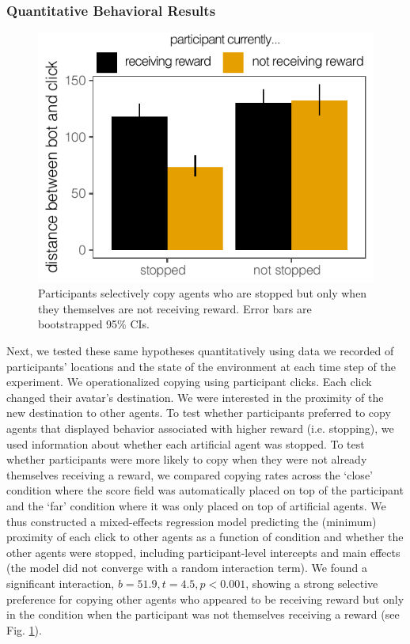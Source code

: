 \documentclass[12pt,letterpaper]{article}
\begin{document}
\subsubsection{Quantitative Behavioral Results}

\begin{figure}
    \centering
    \includegraphics[width=0.8 \linewidth]{figures/proximity.pdf}
    \vspace{-1em}
    \caption{Participants selectively copy agents who are stopped but only when they themselves are not receiving reward. Error bars are bootstrapped 95\% CIs.}
    \label{fig:proximity}
\end{figure}

Next, we tested these same hypotheses quantitatively using data we recorded of participants' locations and the state of the environment at each time step of the experiment.
We operationalized copying using participant clicks.
Each click changed their avatar's destination. 
We were interested in the proximity of the new destination to other agents.
To test whether participants preferred to copy agents that displayed behavior associated with higher reward (i.e. stopping), we used information about whether each artificial agent was stopped.
To test whether participants were more likely to copy when they were not already themselves receiving a reward, we compared copying rates across the `close' condition where the score field was automatically placed on top of the participant and the `far' condition where it was only placed on top of artificial agents.
We thus constructed a mixed-effects regression model predicting the (minimum) proximity of each click to other agents as a function of condition and whether the other agents were stopped, including participant-level intercepts and main effects (the model did not converge with a random interaction term). 
We found a significant interaction, $b = 51.9, t = 4.5, p < 0.001$, showing a strong selective preference for copying other agents who appeared to be receiving reward but only in the condition when the participant was not themselves receiving a reward (see Fig. \ref{fig:proximity}). 
\end{document}
